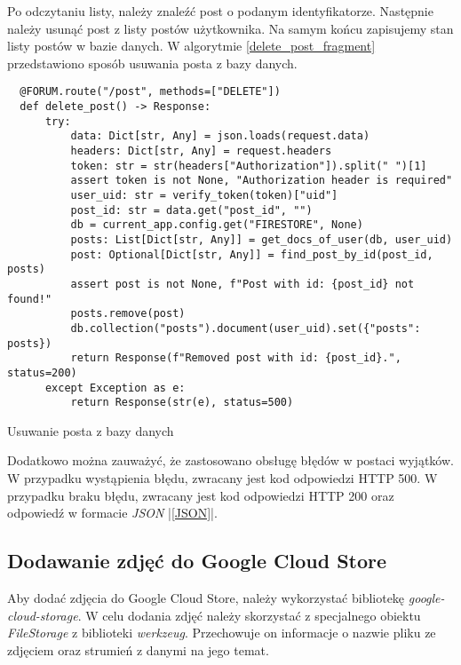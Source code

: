Po odczytaniu listy, należy znaleźć post o podanym identyfikatorze. Następnie należy usunąć post z listy postów użytkownika. Na samym końcu zapisujemy stan listy postów w bazie danych. W algorytmie \ref{delete_post_fragment} przedstawiono sposób usuwania posta z bazy danych.

\begin{code}[H]
  \begin{verbatim}
  @FORUM.route("/post", methods=["DELETE"])
  def delete_post() -> Response:
      try:
          data: Dict[str, Any] = json.loads(request.data)
          headers: Dict[str, Any] = request.headers
          token: str = str(headers["Authorization"]).split(" ")[1]
          assert token is not None, "Authorization header is required"
          user_uid: str = verify_token(token)["uid"]
          post_id: str = data.get("post_id", "")
          db = current_app.config.get("FIRESTORE", None)
          posts: List[Dict[str, Any]] = get_docs_of_user(db, user_uid)
          post: Optional[Dict[str, Any]] = find_post_by_id(post_id, posts)
          assert post is not None, f"Post with id: {post_id} not found!"
          posts.remove(post)
          db.collection("posts").document(user_uid).set({"posts": posts})
          return Response(f"Removed post with id: {post_id}.", status=200)
      except Exception as e:
          return Response(str(e), status=500)
  \end{verbatim}
  \caption{Usuwanie posta z bazy danych}
  \label{delete_post_fragment}
\end{code}

Dodatkowo można zauważyć, że zastosowano obsługę błędów w postaci wyjątków. W przypadku wystąpienia błędu, zwracany jest kod odpowiedzi HTTP 500. W przypadku braku błędu, zwracany jest kod odpowiedzi HTTP 200 oraz odpowiedź w formacie \textit{JSON} |\ref{JSON}|. 

\subsection{Dodawanie zdjęć do Google Cloud Store}
Aby dodać zdjęcia do Google Cloud Store, należy wykorzystać bibliotekę \textit{google-cloud-storage}. W celu dodania zdjęć należy skorzystać z specjalnego obiektu \textit{FileStorage} z biblioteki \textit{werkzeug}. Przechowuje on informacje o nazwie pliku ze zdjęciem oraz strumień z danymi na jego temat. 

